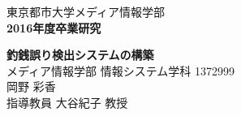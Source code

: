 \documentclass[fleqn,11pt]{jreport}
\begin{document}
\baselineskip 21.5pt

\begin{titlepage}
	\vspace*{3cm}
	\begin{center}
		{\Large\gt 東京都市大学メディア情報学部}\\
		\vspace*{0.5cm}
		{\Large\bf 2016年度卒業研究}\\
		\vspace{1.5cm}

		{\huge\bf 釣銭誤り検出システムの構築}\\


		\vspace{9cm}
		{\Large メディア情報学部 情報システム学科 1372999}\\
		{\Large 岡野 彩香}\\
		\vspace*{0.5cm}
		{\Large 指導教員 大谷紀子 教授}\\
	\end{center}
\end{titlepage}

\tableofcontents
\cleardoublepage











%


\appendix


\end{document}
